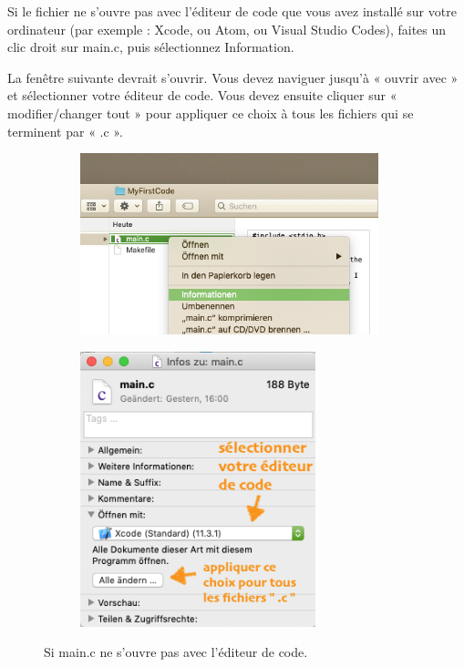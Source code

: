 \documentclass{article}
\begin{document}
Si le fichier ne s'ouvre pas avec l'éditeur de code que vous avez installé sur votre ordinateur (par exemple : Xcode, ou Atom, ou Visual Studio Codes), faites un clic droit sur main.c, puis sélectionnez Information. 

La fenêtre suivante devrait s'ouvrir. Vous devez naviguer jusqu'à « ouvrir avec » et sélectionner votre éditeur de code. Vous devez ensuite cliquer sur « modifier/changer tout  » pour appliquer ce choix à tous les fichiers qui se terminent par « .c ».
\begin{figure}[H]
\begin{subfigure}[c]{0.5\textwidth}
\includegraphics[width=0.95\textwidth]{Plots/OpenMain.png}
\end{subfigure}
\begin{subfigure}[c]{0.5\textwidth}
\includegraphics[width=0.75\textwidth]{Plots/OpenMain2.png}
\end{subfigure}
\caption{Si main.c ne s'ouvre pas avec l'éditeur de code.}
\end{figure}
\end{document}
